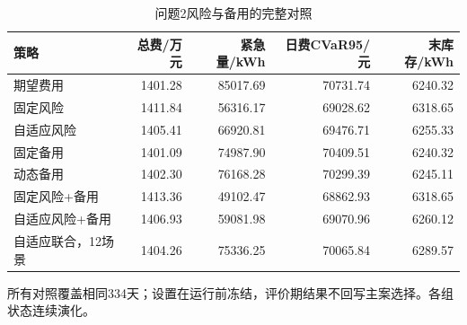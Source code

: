 \begin{table}[htbp]\centering\small
\caption{问题2风险与备用的完整对照}
\label{tab:v2_risk_modules}
\begin{tabularx}{\linewidth}{LRRRR}\toprule
策略 & 总费/万元 & 紧急量/kWh & 日费CVaR95/元 & 末库存/kWh\\\midrule
期望费用 & 1401.28 & 85017.69 & 70731.74 & 6240.32\\
固定风险 & 1411.84 & 56316.17 & 69028.62 & 6318.65\\
自适应风险 & 1405.41 & 66920.81 & 69476.71 & 6255.33\\
固定备用 & 1401.09 & 74987.90 & 70409.51 & 6240.32\\
动态备用 & 1402.30 & 76168.28 & 70299.39 & 6245.11\\
固定风险+备用 & 1413.36 & 49102.47 & 68862.93 & 6318.65\\
自适应风险+备用 & 1406.93 & 59081.98 & 69070.96 & 6260.12\\
自适应联合，12场景 & 1404.26 & 75336.25 & 70065.84 & 6289.57\\
\bottomrule\end{tabularx}
\par\smallskip\parbox{\linewidth}{\footnotesize 所有对照覆盖相同334天；设置在运行前冻结，评价期结果不回写主案选择。各组状态连续演化。}
\end{table}